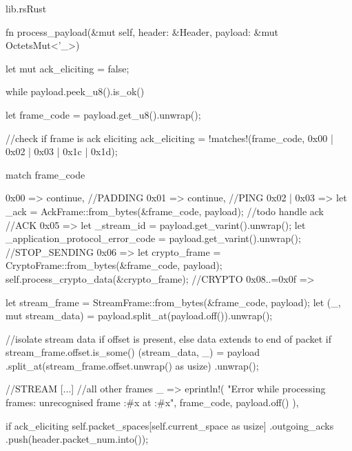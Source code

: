 \begin{codeblock}{lib.rs}{Rust}
    \begin{rustcode}
        fn process_payload(&mut self, header: &Header, payload: &mut OctetsMut<'_>) {
            let mut ack_eliciting = false;

            while payload.peek_u8().is_ok() {
                let frame_code = payload.get_u8().unwrap();

                //check if frame is ack eliciting
                ack_eliciting = !matches!(frame_code, 0x00 | 0x02 | 0x03 | 0x1c | 0x1d);

                match frame_code {
                    0x00 => continue, //PADDING
                    0x01 => continue, //PING
                    0x02 | 0x03 => {
                        let _ack = AckFrame::from_bytes(&frame_code, payload);
                        //todo handle ack
                    } //ACK
                    0x05 => {
                        let _stream_id = payload.get_varint().unwrap();
                        let _application_protocol_error_code = payload.get_varint().unwrap();
                    } //STOP_SENDING
                    0x06 => {
                        let crypto_frame = CryptoFrame::from_bytes(&frame_code, payload);
                        self.process_crypto_data(&crypto_frame);
                    } //CRYPTO
                    0x08..=0x0f => {
                        let stream_frame = StreamFrame::from_bytes(&frame_code, payload);
                        let (_, mut stream_data) = payload.split_at(payload.off()).unwrap();

                        //isolate stream data if offset is present, else data extends to end of packet
                        if stream_frame.offset.is_some() {
                            (stream_data, _) = payload
                                .split_at(stream_frame.offset.unwrap() as usize)
                                .unwrap();
                        }

                    } //STREAM
                    [...] //all other frames
                    _ => eprintln!(
                        "Error while processing frames: unrecognised frame {:#x} at {:#x}",
                        frame_code,
                        payload.off()
                    ),
                }
            }

            if ack_eliciting {
                self.packet_spaces[self.current_space as usize]
                    .outgoing_acks
                    .push(header.packet_num.into());
            }
        }
    \end{rustcode}
    \label{process_payload_code}
\end{codeblock}

